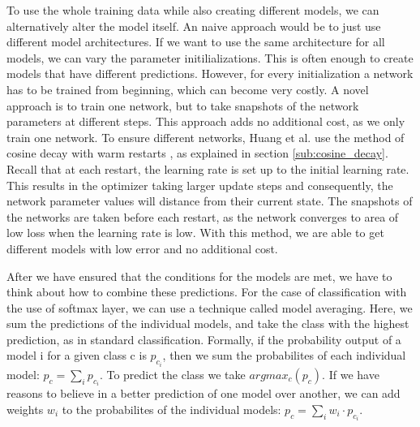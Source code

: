 To use the whole training data while also creating different models, we can
alternatively alter the model itself. An naive approach would be to just use
different model architectures. If we want to use the same architecture for all
models, we can vary the parameter initilializations. This is often enough to
create models that have different predictions. However, for every initialization
a network has to be trained from beginning, which can become very costly. A
novel approach is to train one network, but to take snapshots of the network
parameters at different steps. This approach adds no additional cost, as we only
train one network. To ensure different networks, Huang et al.
\cite{huang2017snapshot} use the method of cosine decay with warm restarts
\cite{loshchilov2016sgdr}, as explained in section \ref{sub:cosine_decay}.
Recall that at each restart, the learning rate is set up to the initial learning
rate. This results in the optimizer taking larger update steps and consequently,
the network parameter values will distance from their current state. The
snapshots of the networks are taken before each restart, as the network
converges to area of low loss when the learning rate is low. With this method,
we are able to get different models with low error and no additional cost.

After we have ensured that the conditions for the models are met, we have to
think about how to combine these predictions. For the case of classification
with the use of softmax layer, we can use a technique called model averaging.
Here, we sum the predictions of the individual models, and take the class with
the highest prediction, as in standard classification. Formally, if the
probability output of a model i for a given class c is $p_{c_i}$, then we sum
the probabilites of each individual model: $p_c = \sum_i p_{c_i}$. To predict
the class we take $argmax_c(p_c)$. If we have reasons to believe in a better
prediction of one model over another, we can add weights $w_i$ to the
probabilites of the individual models: $p_c = \sum_i w_i \cdot p_{c_i}$.


\begin{comment}
Further aspects that could be included:
- classififcation in general
- cross entropy loss and loss functions
- gradient descent
\end{comment}